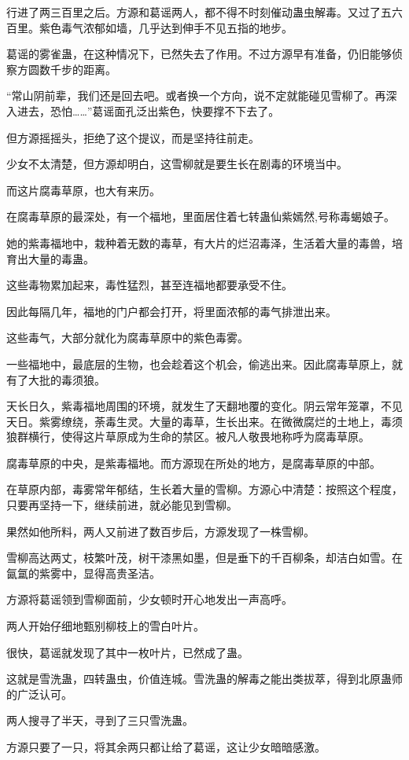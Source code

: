 \begin{this_body}
行进了两三百里之后。方源和葛谣两人，都不得不时刻催动蛊虫解毒。又过了五六百里。紫色毒气浓郁如墙，几乎达到伸手不见五指的地步。

葛谣的雾雀蛊，在这种情况下，已然失去了作用。不过方源早有准备，仍旧能够侦察方圆数千步的距离。

“常山阴前辈，我们还是回去吧。或者换一个方向，说不定就能碰见雪柳了。再深入进去，恐怕……”葛谣面孔泛出紫色，快要撑不下去了。

但方源摇摇头，拒绝了这个提议，而是坚持往前走。

少女不太清楚，但方源却明白，这雪柳就是要生长在剧毒的环境当中。

而这片腐毒草原，也大有来历。

在腐毒草原的最深处，有一个福地，里面居住着七转蛊仙紫嫣然,号称毒蝎娘子。

她的紫毒福地中，栽种着无数的毒草，有大片的烂沼毒泽，生活着大量的毒兽，培育出大量的毒蛊。

这些毒物累加起来，毒性猛烈，甚至连福地都要承受不住。

因此每隔几年，福地的门户都会打开，将里面浓郁的毒气排泄出来。

这些毒气，大部分就化为腐毒草原中的紫色毒雾。

一些福地中，最底层的生物，也会趁着这个机会，偷逃出来。因此腐毒草原上，就有了大批的毒须狼。

天长日久，紫毒福地周围的环境，就发生了天翻地覆的变化。阴云常年笼罩，不见天日。紫雾缭绕，荼毒生灵。大量的毒草，生长出来。在微微腐烂的土地上，毒须狼群横行，使得这片草原成为生命的禁区。被凡人敬畏地称呼为腐毒草原。

腐毒草原的中央，是紫毒福地。而方源现在所处的地方，是腐毒草原的中部。

在草原内部，毒雾常年郁结，生长着大量的雪柳。方源心中清楚：按照这个程度，只要再坚持一下，继续前进，就必能见到雪柳。

果然如他所料，两人又前进了数百步后，方源发现了一株雪柳。

雪柳高达两丈，枝繁叶茂，树干漆黑如墨，但是垂下的千百柳条，却洁白如雪。在氤氲的紫雾中，显得高贵圣洁。

方源将葛谣领到雪柳面前，少女顿时开心地发出一声高呼。

两人开始仔细地甄别柳枝上的雪白叶片。

很快，葛谣就发现了其中一枚叶片，已然成了蛊。

这就是雪洗蛊，四转蛊虫，价值连城。雪洗蛊的解毒之能出类拔萃，得到北原蛊师的广泛认可。

两人搜寻了半天，寻到了三只雪洗蛊。

方源只要了一只，将其余两只都让给了葛谣，这让少女暗暗感激。


\end{this_body}
